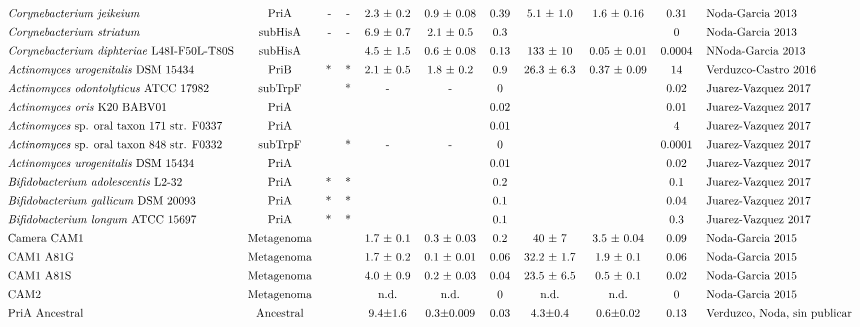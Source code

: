 \documentclass[12pt,twoside]{reedthesis}
\begin{document}
\[{\begin{tabular}{ l c r c c c c c c c l}
  \textit{Corynebacterium} \textit{jeikeium} &PriA&-&-&2.3 ± 0.2&0.9 ± 0.08&0.39&5.1 ± 1.0&1.6 ± 0.16&0.31& Noda-Garcia 2013\\ [1ex]    
  \textit{Corynebacterium} \textit{striatum} &subHisA&-&-&6.9 ± 0.7&2.1 ± 0.5&0.3&&&0& Noda-Garcia 2013 \\ [1ex]    
  \textit{Corynebacterium} \textit{diphteriae}  L48I-F50L-T80S&subHisA&&&4.5 ± 1.5&0.6 ± 0.08&0.13&133 ± 10&0.05 ± 0.01&0.0004&NNoda-Garcia 2013\\ [1ex]    
  \textit{Actinomyces} \textit{urogenitalis} DSM 15434&PriB&*&*&2.1 ± 0.5 &1.8 ± 0.2 &0.9&26.3 ± 6.3& 0.37 ± 0.09 &14&Verduzco-Castro 2016\\ [1ex]   
  \textit{Actinomyces} \textit{odontolyticus}  ATCC 17982&subTrpF&&*&-&-&0&&&0.02&Juarez-Vazquez 2017\\ [1ex]    
  \textit{Actinomyces} \textit{oris} K20 BABV01&PriA&&&&&0.02&&&0.01&Juarez-Vazquez 2017\\ [1ex]    
  \textit{Actinomyces} sp. oral taxon 171 str. F0337&PriA&&&&&0.01&&&4&Juarez-Vazquez 2017\\ [1ex]    
  \textit{Actinomyces} sp. oral taxon 848 str. F0332&subTrpF&&*&-&-&0&&&0.0001&Juarez-Vazquez 2017\\ [1ex]    
  \textit{Actinomyces} \textit{urogenitalis} DSM 15434&PriA&&&&&0.01&&&0.02&Juarez-Vazquez 2017\\ [1ex]    
  \textit{Bifidobacterium} \textit{adolescentis} L2-32&PriA&*&*&&&0.2&&&0.1&Juarez-Vazquez 2017\\ [1ex]    
  \textit{Bifidobacterium} \textit{gallicum} DSM 20093 &PriA&*&*&&&0.1&&&0.04&Juarez-Vazquez 2017\\ [1ex]    
  \textit{Bifidobacterium} \textit{longum} ATCC 15697&PriA&*&*&&&0.1&&&0.3&Juarez-Vazquez 2017\\ [1ex]    
  Camera CAM1&Metagenoma&&&1.7 ± 0.1&0.3 ± 0.03&0.2&40 ± 7&3.5 ± 0.04&0.09&Noda-Garcia 2015\\ [1ex]    
  CAM1 A81G&Metagenoma&&&1.7 ± 0.2&0.1 ± 0.01&0.06&32.2 ± 1.7&1.9 ± 0.1&0.06&Noda-Garcia 2015\\ [1ex]    
  CAM1 A81S&Metagenoma&&&4.0 ± 0.9&0.2 ± 0.03&0.04&23.5 ± 6.5&0.5 ± 0.1&0.02&Noda-Garcia 2015\\ [1ex]    
  CAM2&Metagenoma&&&n.d.&n.d.&0&n.d.&n.d.&0&Noda-Garcia 2015\\ [1ex]    
  PriA Ancestral&Ancestral&&&9.4±1.6&0.3±0.009&0.03&4.3±0.4&0.6±0.02&0.13&Verduzco, Noda, sin publicar\\ [1ex]    

\end{tabular}}\]
\end{document}
